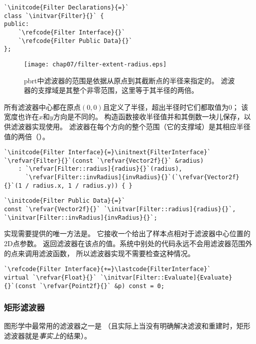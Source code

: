 \begin{lstlisting}
`\initcode{Filter Declarations}{=}`
class `\initvar{Filter}{}` {
public:
    `\refcode{Filter Interface}{}`
    `\refcode{Filter Public Data}{}`
};
\end{lstlisting}

\begin{figure}[htbp]
    \centering\texttt{[image: chap07/filter-extent-radius.eps]}
    \caption{pbrt中滤波器的范围是依据从原点到其截断点的半径来指定的。
        滤波器的支撑域是其整个非零范围，这里等于其半径的两倍。}
    \label{fig:7.40}
\end{figure}

所有滤波器中心都在原点$(0,0)$且定义了半径，超出半径时它们都取值为0；
该宽度也许在$x$和$y$方向是不同的。
构造函数接收半径值并和其倒数一块儿保存，以供滤波器实现使用。
滤波器在每个方向的整个范围（它的支撑域）是其相应半径值的两倍（）。
\begin{lstlisting}
`\initcode{Filter Interface}{=}\initnext{FilterInterface}`
`\refvar{Filter}{}`(const `\refvar{Vector2f}{}` &radius)
    : `\refvar[Filter::radius]{radius}{}`(radius),
      `\refvar[Filter::invRadius]{invRadius}{}`(`\refvar{Vector2f}{}`(1 / radius.x, 1 / radius.y)) { }
\end{lstlisting}
\begin{lstlisting}
`\initcode{Filter Public Data}{=}`
const `\refvar{Vector2f}{}` `\initvar[Filter::radius]{radius}{}`, `\initvar[Filter::invRadius]{invRadius}{}`;
\end{lstlisting}

实现需要提供的唯一方法是。
它接收一个给出了样本点相对于滤波器中心位置的2D点参数。
返回滤波器在该点的值。系统中别处的代码永远不会用滤波器范围外的点来调用滤波函数，
所以滤波器实现不需要检查这种情况。
\begin{lstlisting}
`\refcode{Filter Interface}{+=}\lastcode{FilterInterface}`
virtual `\refvar{Float}{}` `\initvar[Filter::Evaluate]{Evaluate}{}`(const `\refvar{Point2f}{}` &p) const = 0;
\end{lstlisting}

\subsubsection*{矩形滤波器}
图形学中最常用的滤波器之一是
（且实际上当没有明确解决滤波和重建时，矩形滤波器就是\emph{事实上}的结果）。

